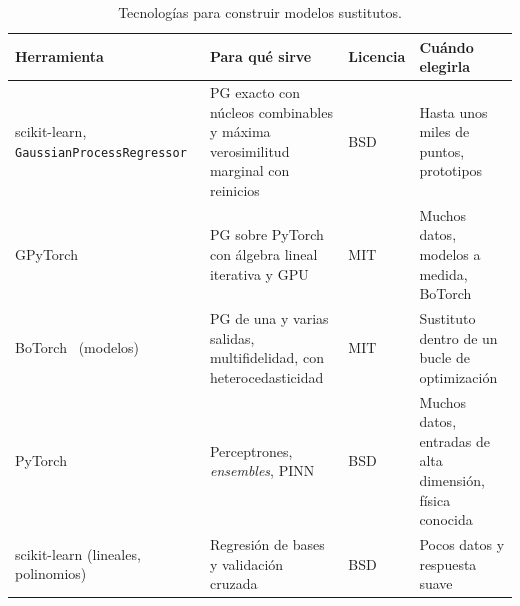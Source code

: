 \begin{table}[ht]
\centering\small
\begin{tabularx}{\textwidth}{@{}>{\raggedright\arraybackslash}p{2.8cm}>{\raggedright\arraybackslash}X>{\raggedright\arraybackslash}p{1.6cm}>{\raggedright\arraybackslash}p{3.6cm}@{}}
\toprule
Herramienta & Para qué sirve & Licencia & Cuándo elegirla \\
\midrule
scikit-learn, \texttt{Gaussian\-Process\-Regressor}~\cite{sklearngp} & PG exacto con núcleos combinables y máxima verosimilitud marginal con reinicios & BSD & Hasta unos miles de puntos, prototipos \\
GPyTorch~\cite{gpytorch} & PG sobre PyTorch con álgebra lineal iterativa y GPU & MIT & Muchos datos, modelos a medida, BoTorch \\
BoTorch~\cite{botorch} (modelos) & PG de una y varias salidas, multifidelidad, con heterocedasticidad & MIT & Sustituto dentro de un bucle de optimización \\
PyTorch & Perceptrones, \emph{ensembles}, PINN & BSD & Muchos datos, entradas de alta dimensión, física conocida \\
scikit-learn (lineales, polinomios) & Regresión de bases y validación cruzada & BSD & Pocos datos y respuesta suave \\
\bottomrule
\end{tabularx}
\caption{Tecnologías para construir modelos sustitutos.}
\label{tab:tec3}
\end{table}

\addtocounter{definicion}{1}%

